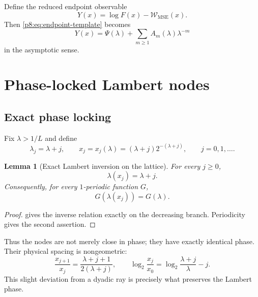 \documentclass[11pt]{article}
\numberwithin{equation}{section}
\newtheorem{lemma}[theorem]{Lemma}
\theoremstyle{definition}
\theoremstyle{remark}
\begin{document}
Define the reduced endpoint observable
\begin{equation}
Y(x)=\log F(x)-\mathcal W_{\mathrm{MSE}}(x).
\label{p8:eq:Y}
\end{equation}
Then \cref{p8:eq:endpoint-template} becomes
\begin{equation}
Y(x)=\Psi(\lambda)+\sum_{m\ge1}A_m(\lambda)\lambda^{-m}
\label{p8:eq:Y-expansion}
\end{equation}
in the asymptotic sense.

\section{Phase-locked Lambert nodes}
\label{p8:sec:lambert}

\subsection{Exact phase locking}

Fix $\lambda>1/L$ and define
\begin{equation}
\lambda_j=\lambda+j,
\qquad
x_j=x_j(\lambda)=(\lambda+j)2^{-(\lambda+j)},
\qquad j=0,1,\ldots.
\label{p8:eq:phase-nodes}
\end{equation}

\begin{lemma}[Exact Lambert inversion on the lattice]
\label{p8:lem:phase-lock}
For every $j\ge0$,
\begin{equation}
\lambda(x_j)=\lambda+j.
\label{p8:eq:phase-inverse}
\end{equation}
Consequently, for every $1$-periodic function $G$,
\begin{equation}
G(\lambda(x_j))=G(\lambda).
\label{p8:eq:periodic-lock}
\end{equation}
\end{lemma}

\begin{proof}
 gives the inverse relation exactly on the decreasing branch. Periodicity gives the second assertion.
\end{proof}

Thus the nodes are not merely close in phase; they have exactly identical phase. Their physical spacing is nongeometric:
\begin{equation}
\frac{x_{j+1}}{x_j}
=\frac{\lambda+j+1}{2(\lambda+j)},
\qquad
\log_2\frac{x_j}{x_0}
=\log_2\frac{\lambda+j}{\lambda}-j.
\label{p8:eq:x-spacing}
\end{equation}
This slight deviation from a dyadic ray is precisely what preserves the Lambert phase.
\end{document}
